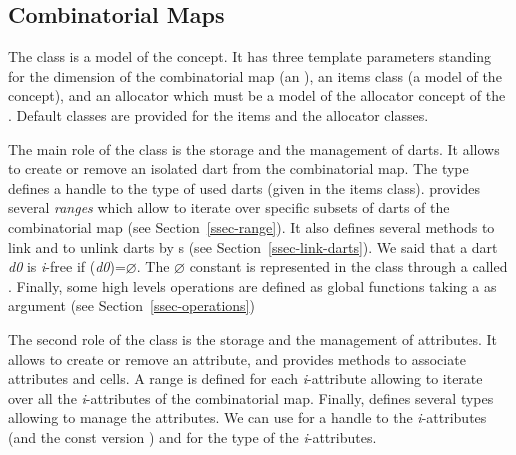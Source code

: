 
\subsection{Combinatorial Maps}\label{ssec-combinatorial-map}
The class  is a model of the
 concept.  It has three template parameters
standing for the dimension of the combinatorial map (an 
), an items class (a model of the 
concept), and an allocator which must be a model of the allocator
concept of the {\stl}.  Default classes are provided for the items and
the allocator classes.

The main role of the class  is the storage and
the management of darts. It allows to create or remove an isolated
dart from the combinatorial map.  The  type defines a
handle to the type of used darts (given in the items class).
 provides several \emph{ranges} which allow to
iterate over specific subsets of darts of the combinatorial map (see
Section~\ref{ssec-range}).  It also defines several methods to link
and to unlink darts by \betai{}s (see
Section~\ref{ssec-link-darts}). We said that a dart \emph{d0} is \emph{i}-free 
if \betai{}(\emph{d0})=$\varnothing$.   The $\varnothing$ constant is
represented in the class  through a 
called \nulldart.  Finally, some high levels
operations are defined as global functions taking a
 as argument (see
Section~\ref{ssec-operations})



The second role of the class  is the storage
and the management of attributes.  It allows to create or remove an
attribute, and provides methods to associate attributes and cells.
A range is defined for each \emph{i}-attribute allowing to iterate
over all the \emph{i}-attributes of the combinatorial map.  Finally,
 defines several types allowing to manage the
attributes. We can use
 for a handle to the
\emph{i}-attributes (and the const version
) and
 for the type of the
\emph{i}-attributes.

